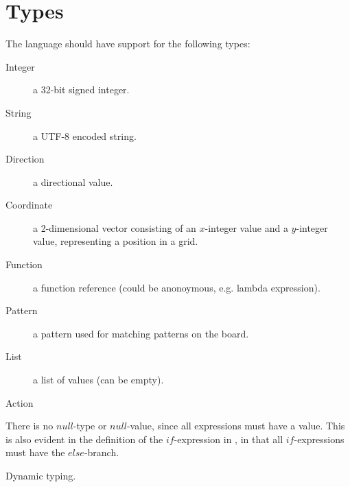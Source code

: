 \section{Types}
\label{sec:types}

The language should have support for the following types:

\begin{description}
\item[Integer] a 32-bit signed integer.
\item[String] a UTF-8 encoded string.
\item[Direction] a directional value.
\item[Coordinate] a 2-dimensional vector consisting of an $x$-integer value and
a $y$-integer value, representing a position in a grid.
\item[Function] a function reference (could be anonoymous, e.g. lambda expression).
\item[Pattern] a pattern used for matching patterns on the board.
\item[List] a list of values (can be empty).
\item[Action]
\end{description}

There is no $null$-type or $null$-value, since all expressions must have a value. This
is also evident in the definition of the $if$-expression in , in that
all $if$-expressions must have the $else$-branch.

Dynamic typing.



